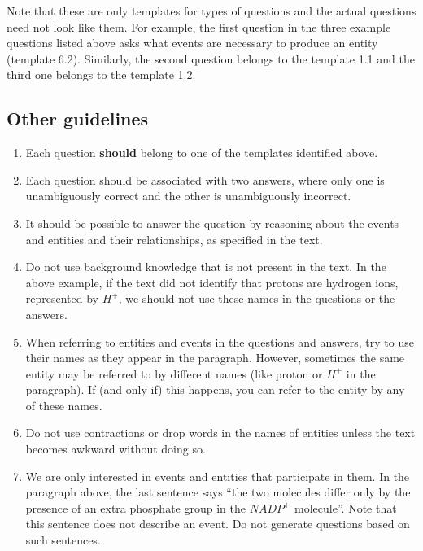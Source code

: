 \documentclass[11pt]{article}
\begin{document}
  Note that these are only templates for types of questions and the
  actual questions need not look like them. For example, the first
  question in the three example questions listed above asks what
  events are necessary to produce an entity (template 6.2). Similarly,
  the second question belongs to the template 1.1 and the third one
  belongs to the template 1.2.
\subsection{Other guidelines}
\label{sec-3-1}

\begin{enumerate}
\item Each question \textbf{should} belong to one of the templates
      identified above.
\item Each question should be associated with two answers, where only
      one is unambiguously correct and the other is unambiguously
      incorrect.
\item It should be possible to answer the question by reasoning about
      the events and entities and their relationships, as specified in
      the text.
\item Do not use background knowledge that is not present in the
      text. In the above example, if the text did not identify that
      protons are hydrogen ions, represented by $H^+$, we should not
      use these names in the questions or the answers.
\item When referring to entities and events in the questions and
      answers, try to use their names as they appear in the paragraph.
      However, sometimes the same entity may be referred to by
      different names (like proton or $H^+$ in the paragraph). If
      (and only if) this happens, you can refer to the entity by any
      of these names.
\item Do not use contractions or drop words in the names of entities
      unless the text becomes awkward without doing so.
\item We are only interested in events and entities that participate
      in them. In the paragraph above, the last sentence says ``the two
      molecules differ only by the presence of an extra phosphate
      group in the $NADP^+$ molecule''. Note that this sentence does
      not describe an event. Do not generate questions based on such
      sentences.
\end{enumerate}

   
\end{document}
